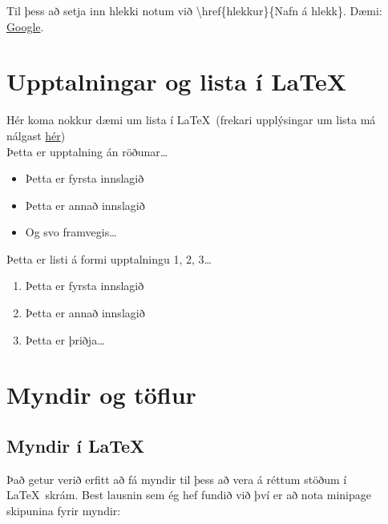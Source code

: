 \documentclass[a4paper]{article}
\begin{document}
Til þess að setja inn hlekki notum við \textbackslash href\{hlekkur\}\{Nafn á hlekk\}. Dæmi: \href{http://google.com}{Google}.


\section{Upptalningar og lista í \LaTeX}
Hér koma nokkur dæmi um lista í \LaTeX\ (frekari upplýsingar um lista má nálgast \href{http://en.wikibooks.org/wiki/LaTeX/List_Structures}{hér}) \\ %

\noindent Þetta er upptalning án röðunar\dots

\begin{itemize}
  \item Þetta er fyrsta innslagið
  \item Þetta er annað innslagið
  \item Og svo framvegis\ldots
\end{itemize}

\noindent Þetta er listi á formi upptalningu 1, 2, 3\dots
\begin{enumerate}
  \item Þetta er fyrsta innslagið
  \item Þetta er annað innslagið
  \item Þetta er þriðja\ldots
\end{enumerate}



\section{Myndir og töflur}
\subsection{Myndir í \LaTeX}
Það getur verið erfitt að fá myndir til þess að vera á réttum stöðum í \LaTeX\ skrám. Best lausnin sem ég hef fundið við því er að nota minipage skipunina fyrir myndir:
\end{document}
